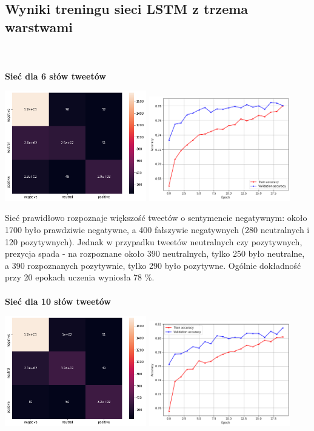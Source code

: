 \documentclass[11pt, a4paper, notitlepage]{report}
\begin{document}
\subsection{Wyniki treningu sieci LSTM z trzema warstwami}
 \\ \\
 {\bf Sieć dla 6 słów tweetów}
\begin{center}
\includegraphics[width=175pt]{graphics/heatmap_LSTM_6_slow.png}
\includegraphics[width=175pt]{graphics/accuracy_LSTM_6_slow.png}
\end{center}
Sieć prawidłowo rozpoznaje większość tweetów o sentymencie negatywnym: około 1700 było prawdziwie negatywne, a 400 fałszywie negatywnych (280 neutralnych i 120 pozytywnych). Jednak w przypadku tweetów neutralnych czy pozytywnych, prezycja spada - na rozpoznane około 390 neutralnych, tylko 250 było neutralne, a 390 rozpoznanych pozytywnie, tylko 290 było pozytywne. Ogólnie dokładność przy 20 epokach uczenia wyniosła 78 \%.
\\ \\
 {\bf Sieć dla 10 słów tweetów}
\begin{center}
\includegraphics[width=175pt]{graphics/heatmap_LSTM_10_slow.png}
\includegraphics[width=175pt]{graphics/accuracy_LSTM_10_slow.png}
\end{center}
\end{document}
